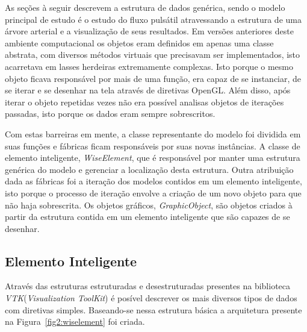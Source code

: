 \documentclass[
        english,			
        brazil			        %
        ,<...>]{abntbibufjf}
\begin{document}
As seções à seguir descrevem a estrutura de dados genérica, sendo o modelo principal de estudo é o estudo do fluxo pulsátil atravessando a estrutura de uma árvore arterial e a visualização de seus resultados. Em versões anteriores deste ambiente computacional os objetos eram definidos em apenas uma classe abstrata, com diversos métodos virtuais que precisavam ser implementados, isto acarretava em lasses herdeiras extremamente complexas. Isto porque o mesmo objeto ficava responsável por mais de uma função, era capaz de se instanciar, de se iterar e se desenhar na tela através de diretivas OpenGL. Além disso, após iterar o objeto repetidas vezes não era possível analisas objetos de iterações passadas, isto porque os dados eram sempre sobrescritos.

Com estas barreiras em mente, a classe representante do modelo foi dividida em suas funções e fábricas ficam responsáveis por suas novas instâncias. A classe de elemento inteligente, \textit{WiseElement}, que é responsável por manter uma estrutura genérica  do modelo e gerenciar a localização desta estrutura. Outra atribuição dada as fábricas foi a iteração dos modelos contidos em um elemento inteligente, isto porque o processo de iteração envolve a criação de um novo objeto para que não haja sobrescrita. Os objetos gráficos, \textit{GraphicObject}, são objetos criados à partir da estrutura contida em um elemento inteligente que são capazes de se desenhar.

\subsection{Elemento Inteligente}\label{sec:elemento_inteligente}

Através das estruturas estruturadas e desestruturadas presentes na biblioteca \textit{VTK}(\textit{Visualization ToolKit}) é posível descrever os mais diversos tipos de dados com diretivas simples. Baseando-se nessa estrutura básica a arquitetura presente na Figura~\ref{fig2:wiselement} foi criada.
\end{document}
